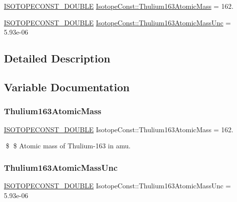 \begin{DoxyCompactItemize}
\item 
\mbox{\hyperlink{group___isotope_const-_macros_ga8f45a7272ce02c0b4c65c44636ed719a}{I\+S\+O\+T\+O\+P\+E\+C\+O\+N\+S\+T\+\_\+\+D\+O\+U\+B\+LE}} \mbox{\hyperlink{group___isotope_const-_thulium-_tm163_gaa39e27a726b5f168019e7eaf5faa8595}{Isotope\+Const\+::\+Thulium163\+Atomic\+Mass}} = 162.
\item 
\mbox{\hyperlink{group___isotope_const-_macros_ga8f45a7272ce02c0b4c65c44636ed719a}{I\+S\+O\+T\+O\+P\+E\+C\+O\+N\+S\+T\+\_\+\+D\+O\+U\+B\+LE}} \mbox{\hyperlink{group___isotope_const-_thulium-_tm163_ga61d19b7e51198db02ef626285330635f}{Isotope\+Const\+::\+Thulium163\+Atomic\+Mass\+Unc}} = 5.\+93e-\/06
\end{DoxyCompactItemize}


\subsection{Detailed Description}


\subsection{Variable Documentation}
\mbox{\label{group___isotope_const-_thulium-_tm163_gaa39e27a726b5f168019e7eaf5faa8595}} 
\subsubsection{\texorpdfstring{Thulium163\+Atomic\+Mass}{Thulium163AtomicMass}}
{\footnotesize\ttfamily \mbox{\hyperlink{group___isotope_const-_macros_ga8f45a7272ce02c0b4c65c44636ed719a}{I\+S\+O\+T\+O\+P\+E\+C\+O\+N\+S\+T\+\_\+\+D\+O\+U\+B\+LE}} Isotope\+Const\+::\+Thulium163\+Atomic\+Mass = 162.}

\$ \$ Atomic mass of Thulium-\/163 in amu. \mbox{\label{group___isotope_const-_thulium-_tm163_ga61d19b7e51198db02ef626285330635f}} 
\subsubsection{\texorpdfstring{Thulium163\+Atomic\+Mass\+Unc}{Thulium163AtomicMassUnc}}
{\footnotesize\ttfamily \mbox{\hyperlink{group___isotope_const-_macros_ga8f45a7272ce02c0b4c65c44636ed719a}{I\+S\+O\+T\+O\+P\+E\+C\+O\+N\+S\+T\+\_\+\+D\+O\+U\+B\+LE}} Isotope\+Const\+::\+Thulium163\+Atomic\+Mass\+Unc = 5.\+93e-\/06}

